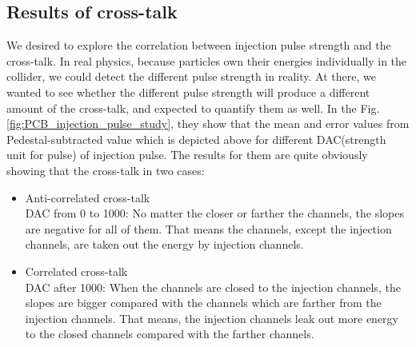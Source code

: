 \documentclass[12pt,twoside,a4paper,an,final]{cms-tdr}
\begin{document}
\subsection{Results of cross-talk}


We desired to explore the correlation between injection pulse strength and the cross-talk. In real physics, because particles own their energies individually in the collider, we could detect the different pulse strength in reality. At there, we wanted to see whether the different pulse strength will produce a different amount of the cross-talk, and expected to quantify them as well. In the Fig.\ref{fig:PCB_injection_pulse_study}, they show that the mean and error values from Pedestal-subtracted value which is depicted above for different DAC(strength unit for pulse) of injection pulse. The results for them are quite obviously showing that the cross-talk in two cases: 
\begin{itemize}
\item Anti-correlated cross-talk\\
DAC from 0 to 1000: No matter the closer or farther the channels, the slopes are negative for all of them. That means the channels, except the injection channels, are taken out the energy by injection channels. 
\item Correlated cross-talk\\
DAC after 1000: When the channels are closed to the injection channels, the slopes are bigger compared with the channels which are farther from the injection channels. That means, the injection channels leak out more energy to the closed channels compared with the farther channels. 
\end{itemize}
\end{document}
